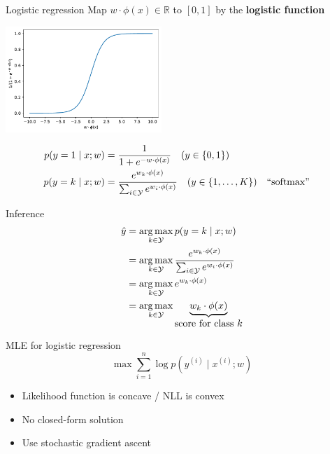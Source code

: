 \documentclass[usenames,dvipsnames,notes,11pt,aspectratio=169]{beamer}
\newcommand{\pdfnote}[1]{}
\begin{document}
\begin{frame}
    {Logistic regression}
    Map $w\cdot\phi(x) \in\mathbb{R}$ to $[0,1]$ by the \textbf{logistic function}
    \vspace{-1em}
    \begin{center}
        \includegraphics[height=4cm]{figures/logistic}
    \end{center}
    \vspace{-2em}
    \begin{align*}
    p(y=1\mid x; w) &= \frac{1}{1 + e^{-w\cdot\phi(x)}} \quad (y\in \left\{ 0,1 \right\})\\
        p(y=k\mid x; w) &= \frac{e^{w_k\cdot\phi(x)}}{\sum_{i\in\mathcal{Y}}e^{w_i\cdot\phi(x)}} \quad (y\in \left\{ 1, \ldots, K \right\}) && \text{``softmax''}
    \end{align*}
    \pdfnote{
        Note that in multiclass classification setting, there is one $w$ for each class.
    }
\end{frame}

\begin{frame}
    {Inference}
    \begin{align}
        \hat{y} &= \operatorname*{arg\,max}_{k\in\mathcal{Y}} p(y=k\mid x; w) \\
        &= \operatorname*{arg\,max}_{k\in\mathcal{Y}} \frac{e^{w_k\cdot\phi(x)}}{\sum_{i\in\mathcal{Y}}e^{w_i\cdot\phi(x)}} \\
        &= \operatorname*{arg\,max}_{k\in\mathcal{Y}} e^{w_k\cdot\phi(x)} \\
        &= \operatorname*{arg\,max}_{k\in\mathcal{Y}} \underbrace{w_k\cdot\phi(x)}_{\textstyle\text{score for class $k$}}
    \end{align}
\end{frame}

\begin{frame}
    {MLE for logistic regression}
    $$
    \max \sum_{i=1}^n \log p(y^{(i)}\mid x^{(i)}; w) 
    $$
    \begin{itemize}
        \item Likelihood function is concave / NLL is convex
            \pause
        \item No closed-form solution 
        \item Use stochastic gradient ascent 
    \end{itemize}
    \pdfnote{LR is probabilistic, so we can still do MLE.}
    \pdfnote{Is there a closed form solution?}
\end{frame}
\end{document}

